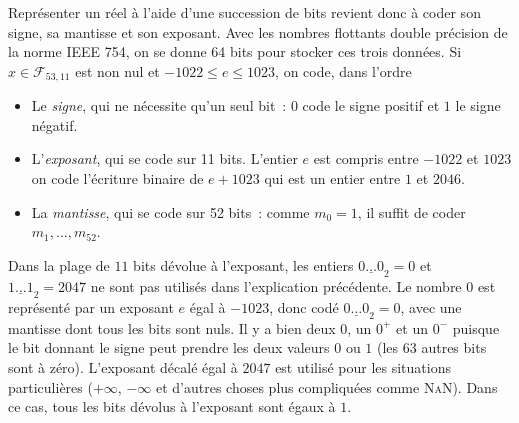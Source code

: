 \documentclass{magnoliaold}
\begin{document}
\begin{remarques}
  \remarque Représenter un réel à l'aide d'une succession de bits revient donc à coder son signe, sa
    mantisse et son exposant. Avec les nombres flottants double précision de la norme \textsc{IEEE 754},
    on se donne 64 bits pour stocker ces trois données. Si $x\in\mathcal{F}_{53,11}$ est non nul
    et $-1022\leq e\leq 1023$, on code, dans l'ordre
  \begin{itemize}
  \item Le \emph{signe}, qui ne nécessite qu'un seul bit~: $0$ code le signe positif et $1$ le signe négatif.
  \item L'\emph{exposant}, qui se code sur 11 bits. L'entier $e$ est compris entre $-1022$
    et $1023$ on code l'écriture binaire de $e+1023$ qui est un entier entre
    $1$ et $2046$.
  \item La \emph{mantisse}, qui se code sur 52 bits~: comme $m_0=1$, il suffit de
    coder $m_1,\ldots,m_{52}$.
  \end{itemize}
  \remarque Dans la plage de $11$ bits dévolue à l'exposant, les entiers
    $\underline{0\ldots0}_2=0$ et $\underline{1\ldots 1}_2=2047$  ne sont pas utilisés
    dans l'explication précédente. Le nombre 0 est représenté par un exposant $e$ égal à $-1023$, donc codé
    $\underline{0\ldots0}_2=0$, avec une mantisse dont tous les bits sont nuls. Il y a bien deux $0$, un $0^+$ et un $0^-$ puisque le bit donnant
    le signe peut prendre les deux valeurs $0$ ou $1$ (les $63$ autres bits sont à zéro).
     L'exposant décalé égal à $2047$ est utilisé pour les situations particulières
     ($+\infty$, $-\infty$ et d'autres choses plus compliquées comme \textsc{NaN}). Dans ce cas, tous les bits dévolus à l'exposant sont 
     égaux à $1$.
  \end{remarques}
\end{document}
